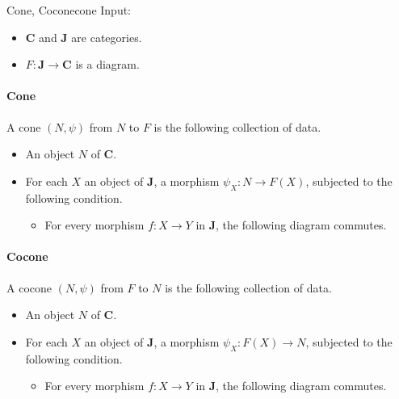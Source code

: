 \documentclass{article}
\begin{document}
\begin{definition}{Cone, Cocone}{cone}
    Input:
    \begin{itemize}
        \item $\mathbf{C}$ and $\mathbf{J}$ are categories.
        \item $F:\mathbf{J}\rightarrow\mathbf{C}$ is a diagram.
    \end{itemize}
    \paragraph*{Cone}
    A cone $(N,\psi)$ from $N$ to $F$ is the following collection of data.
    \begin{itemize}
        \item An object $N$ of $\mathbf{C}$.
        \item For each $X$ an object of $\mathbf{J}$, a morphism $\psi_X: N\rightarrow F(X)$, subjected to the following condition.
        \begin{itemize}
            \item For every morphism $f:X\rightarrow Y$ in $\mathbf{J}$, the following diagram commutes.
            \begin{center}
            \end{center}
        \end{itemize}
    \end{itemize}
    \tcblower
    \paragraph*{Cocone}
    A cocone $(N,\psi)$ from $F$ to $N$ is the following collection of data.
    \begin{itemize}
        \item An object $N$ of $\mathbf{C}$.
        \item For each $X$ an object of $\mathbf{J}$, a morphism $\psi_X: F(X) \rightarrow N$, subjected to the following condition.
        \begin{itemize}
            \item For every morphism $f:X\rightarrow Y$ in $\mathbf{J}$, the following diagram commutes.
            \begin{center}
            \end{center}
        \end{itemize}
    \end{itemize}
\end{definition}
\end{document}
